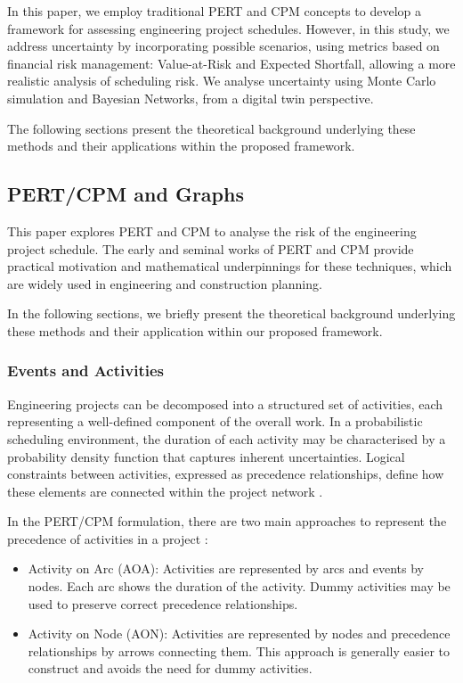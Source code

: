 In this paper, we employ traditional PERT and CPM concepts to develop a framework for assessing engineering project schedules. However, in this study, we address uncertainty by incorporating possible scenarios, using metrics based on financial risk management: Value-at-Risk and Expected Shortfall, allowing a more realistic analysis of scheduling risk. We analyse uncertainty using Monte Carlo simulation and Bayesian Networks, from a digital twin perspective. 

The following sections present the theoretical background underlying these methods and their applications within the proposed framework. 

\subsection{PERT/CPM and Graphs}

This paper explores PERT and CPM to analyse the risk of the engineering project schedule. The early and seminal works of PERT \citep{Malcolm1959, Clark1962, Elmaghraby1967} and CPM \citep{Kelley1961, Fulkerson1961} provide practical motivation and mathematical underpinnings for these techniques, which are widely used in engineering and construction planning. 

In the following sections, we briefly present the theoretical background underlying these methods and their application within our proposed framework.

 
\subsubsection{Events and Activities}
Engineering projects can be decomposed into a structured set of activities, each representing a well-defined component of the overall work. In a probabilistic scheduling environment, the duration of each activity may be characterised by a probability density function that captures inherent uncertainties. Logical constraints between activities, expressed as precedence relationships, define how these elements are connected within the project network \cite{bagshaw2011, moder2020}. 


In the PERT/CPM formulation, there are two main approaches to represent the precedence of activities in a project 
 \citep{jafari2019, singh2018}: 

\begin{itemize}
    \item Activity on Arc (AOA): Activities are represented by arcs and events by nodes. Each arc shows the duration of the activity. Dummy activities may be used to preserve correct precedence relationships.
    
    \item Activity on Node (AON): Activities are represented by nodes and precedence relationships by arrows connecting them. This approach is generally easier to construct and avoids the need for dummy activities.
\end{itemize}

